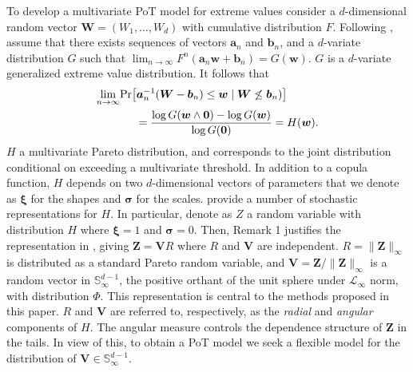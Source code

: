 
To develop a multivariate PoT model for extreme values consider a 
$d$-dimensional random vector $\bm{W} = (W_1, \ldots ,W_d)$ with
cumulative distribution $F$. Following \cite{RoSeWa2018a}, assume 
that there exists sequences of vectors $\bm{a}_n$ and $\bm{b}_n$,
and a $d$-variate distribution $G$ such that 
$\lim_{n\rightarrow\infty} F^n(\bm{a}_n \bm{w} + \bm{b}_n) = 
G(\bm{w})$. $G$ is a $d$-variate generalized extreme value 
distribution. It follows that
\begin{equation*}
    \begin{aligned}
    \lim\limits_{n\rightarrow\infty} &\prob{\bm{a}^{-1}_n (\bm{W} - \bm{b}_n) 
   \leq \bm{w} \mid \bm{W} \not\leq \bm{b}_n)} \\ 
     &\hspace{0.5cm}= \frac{\log G(\bm{w} \wedge \bm{0}) 
    - \log G(\bm{w}) }{\log G(\bm{0})} = H(\bm{w}).
    \end{aligned}
\end{equation*}
$H$ a multivariate Pareto distribution, and corresponds to the joint
distribution conditional on exceeding a multivariate threshold. In addition to
a copula function, $H$ depends on two $d$-dimensional vectors of 
parameters that we denote as $\bm{\xi}$ for the shapes and $\bm{\sigma}$ 
for the scales. \cite{RoSeWa2018a} provide a number of stochastic 
representations for $H$.  In particular, denote as $Z$ a
random variable with distribution $H$ where $\bm{\xi}= 1$ and 
$\bm{\sigma} = 0$.  Then, Remark 1 justifies the representation in 
\cite{ferreira2014}, giving $\bm{Z} = \bm{V}R$
where $R$ and $\bm{V}$ are independent. $R = \|\bm{Z}\|_\infty$ is 
distributed as a standard Pareto random variable, and $\bm{V} = 
\bm{Z}/\|\bm{Z}\|_\infty$ is a random vector in  
$\mathbb{S}_{\infty}^{d-1}$, the positive orthant of the 
unit sphere under $\mathcal{L}_{\infty}$ norm, with distribution $\Phi$. 
This representation is central to the methods proposed in this paper.
$R$ and $\bm{V}$ are referred to, respectively, as the {\em radial} 
and {\em angular} components of $H$. The angular measure controls 
the dependence  structure of $\bm{Z}$  in the tails. In view of 
this, to obtain a  PoT model we seek a flexible model for the 
distribution of $\bm{V} \in {\mathbb S}_{\infty}^{d-1}$.

